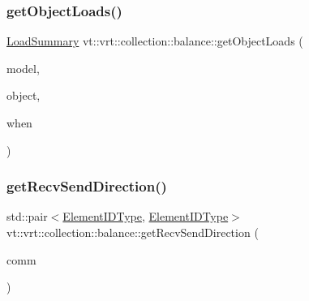 \mbox{\label{namespacevt_1_1vrt_1_1collection_1_1balance_a5e4d4bdd2fceaebcb89d669b8a1b2361}} 
\subsubsection{\texorpdfstring{get\+Object\+Loads()}{getObjectLoads()}\hspace{0.1cm}{\footnotesize\ttfamily [2/2]}}
{\footnotesize\ttfamily \hyperlink{structvt_1_1vrt_1_1collection_1_1balance_1_1_load_summary}{Load\+Summary} vt\+::vrt\+::collection\+::balance\+::get\+Object\+Loads (\begin{DoxyParamCaption}\item[{\hyperlink{structvt_1_1vrt_1_1collection_1_1balance_1_1_load_model}{Load\+Model} $\ast$}]{model,  }\item[{\hyperlink{namespacevt_1_1vrt_1_1collection_1_1balance_a9f5b53fafb270212279a4757d2c4cd28}{Element\+I\+D\+Struct}}]{object,  }\item[{\hyperlink{structvt_1_1vrt_1_1collection_1_1balance_1_1_phase_offset}{Phase\+Offset}}]{when }\end{DoxyParamCaption})}

\mbox{\label{namespacevt_1_1vrt_1_1collection_1_1balance_a00d08e980a291c93c4c8b34101e7cd3f}} 
\subsubsection{\texorpdfstring{get\+Recv\+Send\+Direction()}{getRecvSendDirection()}}
{\footnotesize\ttfamily std\+::pair$<$\hyperlink{namespacevt_1_1vrt_1_1collection_1_1balance_a592736f733df4f90856df90a1fd08905}{Element\+I\+D\+Type}, \hyperlink{namespacevt_1_1vrt_1_1collection_1_1balance_a592736f733df4f90856df90a1fd08905}{Element\+I\+D\+Type}$>$ vt\+::vrt\+::collection\+::balance\+::get\+Recv\+Send\+Direction (\begin{DoxyParamCaption}\item[{\hyperlink{namespacevt_1_1elm_a89067ebf8407548591583dd2f60b53b5}{elm\+::\+Comm\+Key\+Type} const \&}]{comm }\end{DoxyParamCaption})}

